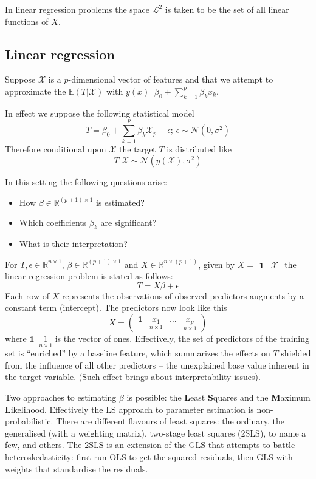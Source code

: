 \documentclass[a4paper]{article}
\newcommand{\induc}[1]{{\left . #1 \right \vert}}
\newcommand{\Real}{\mathbb{R}}
\newcommand{\Ncal}{\mathcal{N}}
\newcommand{\Lcal}{\mathcal{L}}
\newcommand{\ex}{\mathbb{E}}
\newcommand{\one}{\mathbf{1}}
\newcommand{\defn}{\mathop{\overset{\Delta}{=}}\nolimits}
\begin{document}
In linear regression problems the space $\Lcal^2$ is taken to be the set of all
linear functions of $X$.

\subsection*{Linear regression} %
\label{sub:linear_regression}

Suppose $\mathcal{X}$ is a $p$-dimensional vector of features and that we attempt to approximate
the $\ex(T\rvert \mathcal{X})$ with $y(x) \defn \beta_0 + \sum_{k=1}^p \beta_k x_k$.

In effect we suppose the following statistical model
\[T = \beta_0 + \sum_{k=1}^p \beta_k \mathcal{X}_p + \epsilon;\,\epsilon\sim\Ncal(0,\sigma^2)\]
Therefore conditional upon $\mathcal{X}$ the target $T$ is distributed like
\[\induc{T}\mathcal{X}\sim \Ncal(y(\mathcal{X}),\sigma^2)\]

In this setting the following questions arise: \begin{itemize}
	\item How $\beta\in \Real^{(p+1)\times 1}$ is estimated?
	\item Which coefficients $\beta_k$ are significant?
	\item What is their interpretation?
\end{itemize}
For $T,\epsilon\in \Real^{n\times 1}$, $\beta\in \Real^{(p+1)\times 1}$ and
$X\in \Real^{n\times (p+1)}$, given by $X = \begin{smallmatrix} \one & \mathcal{X} \end{smallmatrix}$
the linear regression problem is stated as follows:
\[T = X\beta + \epsilon\]
Each row of $X$ represents the observations of observed predictors augments by
a constant term (intercept). The predictors now look like this
\[
X = \begin{pmatrix}
\one & \underset{n\times 1}{x_1} & \ldots & \underset{n\times 1}{x_p}
\end{pmatrix}
\]
where $\one \defn \underset{n\times 1}{1}$ is the vector of ones. Effectively, the
set of predictors of the training set is ``enriched'' by a baseline feature, which
summarizes the effects on $T$ shielded from the influence of all other predictors --
the unexplained base value inherent in the target variable. (Such effect brings
about interpretability issues). 

Two approaches to estimating $\beta$ is possible:
the \textbf{L}east \textbf{S}quares and the \textbf{M}aximum \textbf{L}ikelihood.
Effectively the LS approach to parameter estimation is non-probabilistic. There
are different flavours of least squares: the ordinary, the generalised (with a
weighting matrix), two-stage least squares (2SLS), to name a few, and others. The
2SLS is an extension of the GLS that attempts to battle heteroskedasticity: first
run OLS to get the squared residuals, then GLS with weights that standardise the
residuals.
\end{document}
